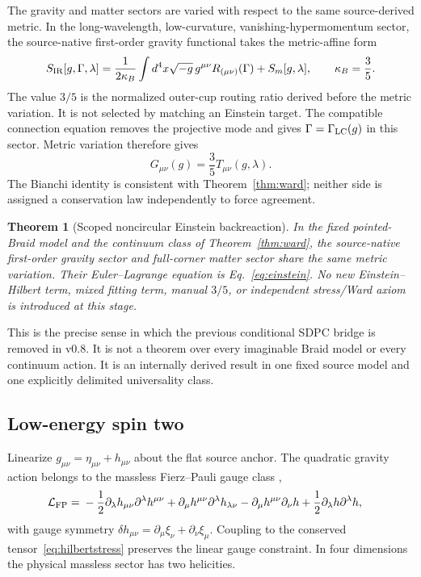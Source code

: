 \documentclass[11pt]{article}
\newtheorem{theorem}{Theorem}[section]
\theoremstyle{definition}
\theoremstyle{remark}
\begin{document}
The gravity and matter sectors are varied with respect to the same source-derived metric. In the long-wavelength, low-curvature, vanishing-hypermomentum sector, the source-native first-order gravity functional takes the metric-affine form
\begin{equation}\label{eq:sir}
 S_{\rm IR}[g,\Gamma,\lambda]
 =\frac{1}{2\kappa_B}\int d^4x\sqrt{-g}\,
 g^{\mu\nu}R_{(\mu\nu)}(\Gamma)
 +S_m[g,\lambda],
 \qquad \kappa_B=\frac35.
\end{equation}
The value $3/5$ is the normalized outer-cup routing ratio derived before the metric variation. It is not selected by matching an Einstein target. The compatible connection equation removes the projective mode and gives $\Gamma=\Gamma_{\rm LC}(g)$ in this sector. Metric variation therefore gives
\begin{equation}\label{eq:einstein}
 \boxed{G_{\mu\nu}(g)=\frac35T_{\mu\nu}(g,\lambda)}.
\end{equation}
The Bianchi identity is consistent with Theorem~\ref{thm:ward}; neither side is assigned a conservation law independently to force agreement.

\begin{theorem}[Scoped noncircular Einstein backreaction]\label{thm:einstein}
In the fixed pointed-Braid model and the continuum class of Theorem~\ref{thm:ward}, the source-native first-order gravity sector and full-corner matter sector share the same metric variation. Their Euler--Lagrange equation is Eq.~\eqref{eq:einstein}. No new Einstein--Hilbert term, mixed fitting term, manual $3/5$, or independent stress/Ward axiom is introduced at this stage.
\end{theorem}

This is the precise sense in which the previous conditional SDPC bridge is removed in v0.8. It is not a theorem over every imaginable Braid model or every continuum action. It is an internally derived result in one fixed source model and one explicitly delimited universality class.

\subsection{Low-energy spin two}

Linearize $g_{\mu\nu}=\eta_{\mu\nu}+h_{\mu\nu}$ about the flat source anchor. The quadratic gravity action belongs to the massless Fierz--Pauli gauge class \cite{fierzpauli1939},
\begin{align}
 \mathcal L_{\rm FP}={}&
 -\frac12\partial_{\lambda}h_{\mu\nu}\partial^{\lambda}h^{\mu\nu}
 +\partial_{\mu}h^{\mu\nu}\partial^{\lambda}h_{\lambda\nu}
 -\partial_{\mu}h^{\mu\nu}\partial_{\nu}h
 +\frac12\partial_{\lambda}h\partial^{\lambda}h,
\end{align}
with gauge symmetry $\delta h_{\mu\nu}=\partial_{\mu}\xi_{\nu}+\partial_{\nu}\xi_{\mu}$. Coupling to the conserved tensor~\eqref{eq:hilbertstress} preserves the linear gauge constraint. In four dimensions the physical massless sector has two helicities.
\end{document}
